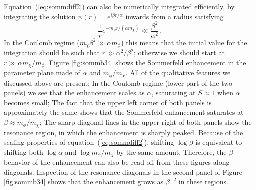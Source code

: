 \documentclass[aps,prd,twocolumn,amsmath,amssymb,floatfix,nofootinbib,10pt]{revtex4}
\newcommand{\somm}{\ensuremath{S}}
\newcommand{\mdm}{\ensuremath{m_{\chi}}}
\newcommand{\mv}{\ensuremath{m_{\phi}}}
\newcommand{\Eqnname}{Equation}
\newcommand{\eqnname}{equation}
\begin{document}
\Eqnname\ (\ref{eq:sommdiff2}) can also be numerically integrated
efficiently, by integrating the solution $\psi(r) = e^{i\beta
r/\alpha}$ inwards from a radius satisfying
\begin{equation}
\frac{1}{r}e^{-\mv r/(\alpha \mdm)} \ll \frac{\beta^2}{\alpha^2} \, .
\end{equation}
In the Coulomb regime ($\mdm \beta^2 \gg \alpha \mv$) this means that
the initial value for the integration should be such that $r \gg
\alpha^2/\beta^2$; otherwise we should start at $r \gg \alpha
\mdm/\mv$. Figure \ref{fig:sommb34} shows the Sommerfeld enhancement
in the parameter plane made of $\alpha$ and $\mv/\mdm$. All of the
qualitative features we discussed above are present: In the Coulomb
regime (lower part of the two panels) we see that the enhancement
scales as $\alpha$, saturating at $\somm \approx 1$ when $\alpha$
becomes small; The fact that the upper left corner of both panels is
approximately the same shows that the Sommerfeld enhancement saturates
at $\beta \approx \mv/\mdm$; The sharp diagonal lines in the upper
right of both panels show the resonance region, in which the
enhancement is sharply peaked. Because of the scaling properties of
\eqnname\ (\ref{eq:sommdiff2}), shifting $\log\beta$ is equivalent to
shifting both $\log\alpha$ and $\log \mv/\mdm$ by the same
amount. Therefore, the $\beta$ behavior of the enhancement can also be
read off from these figures along diagonals. Inspection of the
resonance diagonals in the second panel of Figure \ref{fig:sommb34}
shows that the enhancement grows as $\beta^{-2}$ in these regions.
\end{document}
